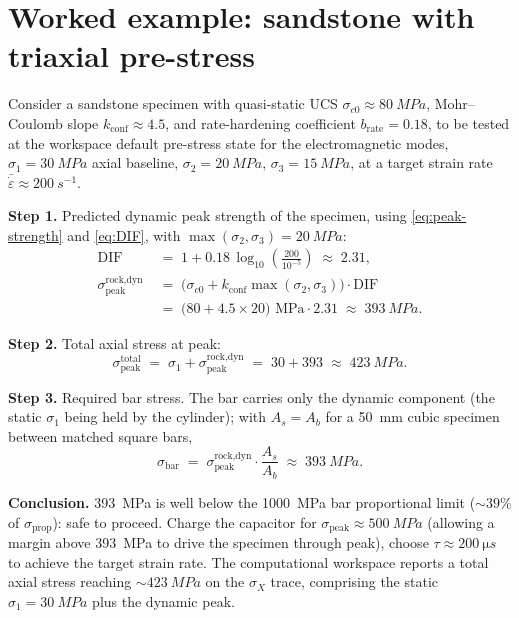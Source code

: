 \documentclass[11pt,a4paper,openany]{book}
\providecommand{\SI}[2]{\qty{#1}{#2}}
\theoremstyle{handbook}
\newcommand{\sig}{\sigma}
\newcommand{\eps}{\varepsilon}
\newcommand{\epsdot}{\dot\eps}
\newcommand{\Ab}{A_b}
\newcommand{\As}{A_s}
\newcommand{\sigprop}{\sig_{\text{prop}}}
\newcommand{\sigpeak}{\sig_{\text{peak}}}
\begin{document}
\section{Worked example: sandstone with triaxial pre-stress}

Consider a sandstone specimen with quasi-static UCS $\sig_{c0}\approx
\SI{80}{MPa}$, Mohr--Coulomb slope $k_{\text{conf}}\approx 4.5$, and
rate-hardening coefficient $b_{\text{rate}}=0.18$, to be tested at the
workspace default pre-stress state for the electromagnetic modes,
$\sig_1=\SI{30}{MPa}$ axial baseline, $\sig_2=\SI{20}{MPa}$,
$\sig_3=\SI{15}{MPa}$, at a target strain rate
$\bar\epsdot\approx\SI{200}{s^{-1}}$.

\textbf{Step 1.} Predicted dynamic peak strength of the specimen, using
\eqref{eq:peak-strength} and \eqref{eq:DIF}, with
$\max(\sig_2,\sig_3)=\SI{20}{MPa}$:
\begin{align*}
  \text{DIF} &\;=\; 1 + 0.18\,\log_{10}\!\left(\frac{200}{10^{-5}}\right)
              \;\approx\; 2.31,\\[2pt]
  \sigpeak^{\text{rock,dyn}}
    &\;=\; \bigl(\sig_{c0}+k_{\text{conf}}\max(\sig_2,\sig_3)\bigr)\cdot\text{DIF} \\
    &\;=\; \bigl(80 + 4.5\times 20\bigr)\text{ MPa}\cdot 2.31
    \;\approx\; \SI{393}{MPa}.
\end{align*}

\textbf{Step 2.} Total axial stress at peak:
\begin{equation*}
  \sigpeak^{\text{total}} \;=\; \sig_1 + \sigpeak^{\text{rock,dyn}}
                          \;=\; 30 + 393 \;\approx\; \SI{423}{MPa}.
\end{equation*}

\textbf{Step 3.} Required bar stress. The bar carries only the dynamic
component (the static $\sig_1$ being held by the cylinder); with $\As=\Ab$
for a \SI{50}{mm} cubic specimen between matched square bars,
\begin{equation*}
  \sig_{\text{bar}} \;=\; \sigpeak^{\text{rock,dyn}}\cdot\frac{\As}{\Ab}
                    \;\approx\; \SI{393}{MPa}.
\end{equation*}

\textbf{Conclusion.} \SI{393}{MPa} is well below the \SI{1000}{MPa} bar
proportional limit ($\sim 39\%$ of $\sigprop$): safe to proceed. Charge
the capacitor for $\sigpeak\approx\SI{500}{MPa}$ (allowing a margin above
\SI{393}{MPa} to drive the specimen through peak), choose
$\tau\approx\SI{200}{\micro s}$ to achieve the target strain rate. The
computational workspace reports a total axial stress reaching $\sim\SI{423}{MPa}$ on
the $\sig_X$ trace, comprising the static $\sig_1=\SI{30}{MPa}$ plus the
dynamic peak.
\end{document}
